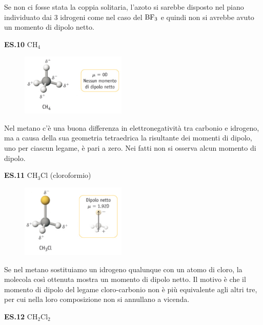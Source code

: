Se non ci fosse stata la coppia solitaria, l'azoto si sarebbe disposto nel piano individuato dai 3 idrogeni come nel caso del $\rm BF_3$ e quindi non si avrebbe avuto un momento di dipolo netto.

\vspace{0.2cm}\textbf{ES.10} CH$_4$

\hspace{0.5cm}\begin{minipage}{0.2\textwidth}
\begin{figure}[H]
\includegraphics[width=5cm]{immagini/CH_4.png}
\end{figure}
\end{minipage} \hfill
\begin{minipage}{0.5\textwidth}
 Nel metano c'è una buona differenza in elettronegatività tra carbonio e idrogeno, ma a causa della sua geometria tetraedrica la risultante dei momenti di dipolo, uno per ciascun legame, è pari a zero. Nei fatti non si osserva alcun momento di dipolo.
\end{minipage}

\vspace{0.2cm}\textbf{ES.11} CH$_3$Cl (cloroformio)

\hspace{0.5cm}\begin{minipage}{0.2\textwidth}
\begin{figure}[H]
\includegraphics[width=5cm]{immagini/CH_3Cl.png}
\end{figure}
\end{minipage} \hfill
\begin{minipage}{0.5\textwidth}
\vspace{0.4cm}Se nel metano sostituiamo un idrogeno qualunque con un atomo di cloro, la molecola così ottenuta mostra un momento di dipolo netto. Il motivo è che il momento di dipolo del legame cloro-carbonio non è più equivalente agli altri tre, per cui nella loro composizione non si annullano a vicenda.
\end{minipage}
\newpage
\vspace{0.2cm}\textbf{ES.12} CH$_2$Cl$_2$

